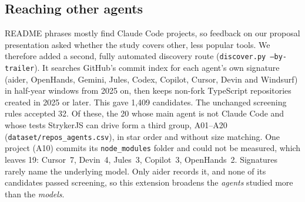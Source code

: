 \documentclass[10pt,conference]{IEEEtran}
\begin{document}
\subsection{Reaching other agents}
README phrases mostly find Claude Code projects, so feedback on our proposal presentation asked whether the study covers other, less popular tools. We therefore added a second, fully automated discovery route (\texttt{discover.py --by-trailer}). It searches GitHub's commit index for each agent's own signature (aider, OpenHands, Gemini, Jules, Codex, Copilot, Cursor, Devin and Windsurf) in half-year windows from 2025 on, then keeps non-fork TypeScript repositories created in 2025 or later. This gave 1,409 candidates. The unchanged screening rules accepted 32. Of these, the 20 whose main agent is not Claude Code and whose tests StrykerJS can drive form a third group, A01--A20 (\texttt{dataset/repos\_agents.csv}), in star order and without size matching. One project (A10) commits its \texttt{node\_modules} folder and could not be measured, which leaves 19: Cursor~7, Devin~4, Jules~3, Copilot~3, OpenHands~2. Signatures rarely name the underlying model. Only aider records it, and none of its candidates passed screening, so this extension broadens the \emph{agents} studied more than the \emph{models}.
\end{document}
